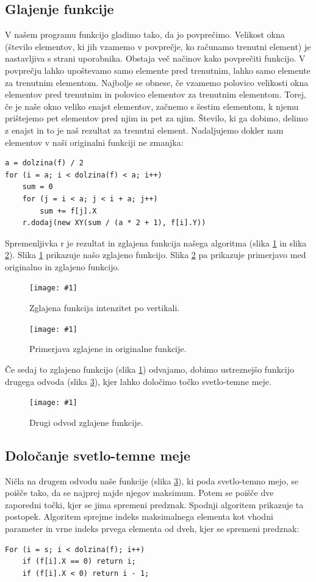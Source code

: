 \documentclass[oneside, a4paper, 12pt]{book}
\newcommand{\slika}[3]{
	\begin{figure}
	\begin{center}
	\texttt{[image: \#1]}
	\end{center}
	\vspace{-20pt}
	\caption{#2}
	\label{#3}
	\end{figure}
}
\begin{document}
\subsection{Glajenje funkcije}
V našem programu funkcijo gladimo tako, da jo povprečimo. Velikost 
okna (število elementov, ki jih vzamemo v povprečje, ko računamo trenutni 
element) je nastavljiva s strani uporabnika. Obstaja več načinov kako 
povprečiti funkcijo. V povprečju lahko upoštevamo samo elemente pred 
trenutnim, lahko samo elemente za trenutnim elementom. Najbolje se obnese, 
če vzamemo polovico velikosti okna elementov pred trenutnim in polovico 
elementov za trenutnim elementom. Torej, če je naše okno veliko enajst 
elementov, začnemo s šestim elementom, k njemu prištejemo pet elementov 
pred njim in pet za njim. Število, ki ga dobimo, delimo z enajst in to 
je naš rezultat za trenutni element. Nadaljujemo dokler nam elementov 
v naši originalni funkciji ne zmanjka:
\pagebreak
\begin{samepage}
\begin{verbatim}
a = dolzina(f) / 2
for (i = a; i < dolzina(f) < a; i++)
    sum = 0
    for (j = i < a; j < i + a; j++)
        sum += f[j].X
    r.dodaj(new XY(sum / (a * 2 + 1), f[i].Y))
\end{verbatim}
\end{samepage}
Spremenljivka r je rezultat in zglajena funkcija našega algoritma 
(slika \ref{pic:smooth1} in slika \ref{pic:smooth2}).
Slika \ref{pic:smooth1} prikazuje našo zglajeno funkcijo. Slika 
\ref{pic:smooth2} pa prikazuje primerjavo med originalno in zglajeno 
funkcijo.

\slika{slike/glajena-funkcija.jpg}{Zglajena funkcija intenzitet po 
vertikali.}{pic:smooth1}

\slika{slike/glajena-+-original.jpg}{Primerjava zglajene in originalne 
funkcije.}{pic:smooth2}

Če sedaj to zglajeno funkcijo (slika \ref{pic:smooth1}) odvajamo, 
dobimo ustreznejšo funkcijo drugega odvoda (slika \ref{pic:d22}), 
kjer lahko določimo točko svetlo-temne meje.

\slika{slike/drugi-odvod-2.jpg}{Drugi odvod zglajene funkcije.}{pic:d22}

\subsection{Določanje svetlo-temne meje}

Ničla na drugem odvodu naše funkcije (slika \ref{pic:d22}), ki poda 
svetlo-temno mejo, se poišče tako, da se najprej najde njegov maksimum. 
Potem se poišče dve zaporedni točki, kjer se jima spremeni predznak. 
Spodnji algoritem prikazuje ta postopek. Algoritem sprejme indeks 
maksimalnega elementa kot vhodni parameter in vrne indeks prvega 
elementa od dveh, kjer se spremeni predznak:
\begin{samepage}
\begin{verbatim}
For (i = s; i < dolzina(f); i++)
    if (f[i].X == 0) return i;
    if (f[i].X < 0) return i - 1;
\end{verbatim}
\end{samepage}
\end{document}
